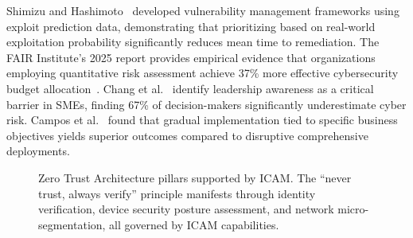 \documentclass[journal]{IEEEtran}
\begin{document}
Shimizu and Hashimoto~\cite{shimizu2025vulnerability} developed vulnerability management
frameworks using exploit prediction data, demonstrating that prioritizing based on
real-world exploitation probability significantly reduces mean time to remediation. The
FAIR Institute's 2025 report provides empirical evidence that organizations employing
quantitative risk assessment achieve 37\% more effective cybersecurity budget
allocation~\cite{fairinstitute2025}. Chang et al.~\cite{chang2025mind} identify
leadership awareness as a critical barrier in SMEs, finding 67\% of decision-makers
significantly underestimate cyber risk. Campos et al.~\cite{campos2025safeguarding}
found that gradual implementation tied to specific business objectives yields superior
outcomes compared to disruptive comprehensive deployments.

\begin{figure}[!t]
\centering
{}
\caption{Zero Trust Architecture pillars supported by ICAM. The ``never trust, always
  verify'' principle manifests through identity verification, device security posture
  assessment, and network micro-segmentation, all governed by ICAM capabilities.}
\label{fig:zt_pillars}
\end{figure}
\end{document}
